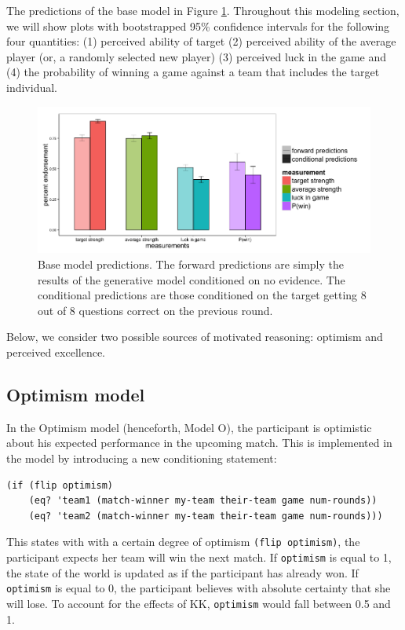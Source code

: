 \documentclass{article}
\begin{document}
The predictions of the base model in Figure \ref{fig:base}. Throughout this modeling section, we will show plots with bootstrapped 95\% confidence intervals for the following four quantities: (1) perceived ability of target (2) perceived ability of the average player (or, a randomly selected new player) (3) perceived luck in the game and (4) the probability of winning a game against a team that includes the target individual. 

\begin{figure}
\centering
    \includegraphics[width=\columnwidth]{basePredictions}
    \caption{Base model predictions. The forward predictions are simply the results of the generative model conditioned on no evidence. The conditional predictions are those conditioned on the target getting 8 out of 8 questions correct on the previous round.}
      \label{fig:base}
\end{figure}


Below, we consider two possible sources of motivated reasoning: optimism and perceived excellence. 
\subsection{Optimism model}

In the Optimism model (henceforth, Model O), the participant is optimistic about his expected performance in the upcoming match. This is implemented in the model by introducing a new conditioning statement: 

\begin{lstlisting}
(if (flip optimism) 
    (eq? 'team1 (match-winner my-team their-team game num-rounds)) 
    (eq? 'team2 (match-winner my-team their-team game num-rounds)))
\end{lstlisting}

This states with with a certain degree of optimism \lstinline{(flip optimism)}, the participant expects her team will win the next match. If \lstinline{optimism} is equal to 1, the state of the world is updated as if the participant has already won. If  \lstinline{optimism} is equal to 0, the participant believes with absolute certainty that she will lose. To account for the effects of KK, \lstinline{optimism} would fall between 0.5 and 1. 
\end{document}

